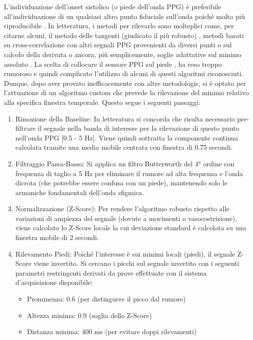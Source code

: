 \documentclass[11pt,a4paper]{article}
\begin{document}
L'individuazione dell'onset sistolico (o piede dell'onda PPG) è preferibile all'individuazione di un qualsiasi altro punto fiduciale sull'onda poiché molto più riproducibile \cite{mukkamala2015}. In letteratura, i metodi per rilevarlo sono molteplici come, per citarne alcuni, il metodo delle tangenti (giudicato il più robusto) \cite{mukkamala2015}, metodi basati su cross-correlazione con altri segnali PPG provenienti da diversi punti \cite{lazazzera2019} o sul calcolo della derivata \cite{Welykholowa2020-pu} o ancora, più semplicemente, soglie adattative sul minimo assoluto \cite{Finnegan2021} . La scelta di collocare il sensore PPG sul piede \cite{Block2020-ad}, ha reso troppo rumoroso e quindi complicato l'utilizzo di alcuni di questi algoritmi riconosciuti. Dunque, dopo aver provato inefficacemente con altre metodologie, si è optato per l'attuazione di un algoritmo custom che prevede la rilevazione del minimo relativo alla specifica finestra temporale. Questo segue i seguenti passaggi: 
\begin{enumerate}
  \item Rimozione della Baseline: In letteratura si concorda che risulta necessario pre-filtrare il segnale nella banda di interesse per la rilevazione di questo punto nell'onda PPG [0.5 - 5 Hz]. Viene quindi sottratta la componente continua calcolata tramite una media mobile centrata con finestra di 0.75 secondi.
  \item Filtraggio Passa-Basso: Si applica un filtro Butterworth del 4° ordine con frequenza di taglio a 5 Hz per eliminare il rumore ad alta frequenza e l'onda dicrota (che potrebbe essere confusa con un piede), mantenendo solo le armoniche fondamentali dell'onda sfigmica.
  \item Normalizzazione (Z-Score): Per rendere l'algoritmo robusto rispetto alle variazioni di ampiezza del segnale (dovute a movimenti o vasocostrizione), viene calcolato lo Z-Score locale la cui deviazione standard è calcolata su una finestra mobile di 2 secondi.
  \item Rilevamento Piedi: Poiché l'interesse è sui minimi locali (piedi), il segnale Z-Score viene invertito. Si cercano i picchi sul segnale invertito con i seguenti parametri restringenti derivati da prove effettuate con il sistema d'acquisizione disponibile:
\begin{itemize}
    \item Prominenza: 0.6 (per distinguere il picco dal rumore)
\item Altezza minima: 0.9 (soglia dello Z-Score)
\item Distanza minima: 400 ms (per evitare doppi rilevamenti)
\end{itemize}
\end{enumerate}
\end{document}
